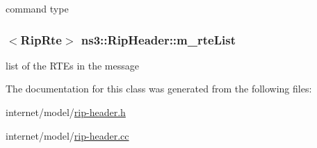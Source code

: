 command type 

\subsubsection[{\texorpdfstring{m\+\_\+rte\+List}{m_rteList}}]{$<${\bf Rip\+Rte}$>$ ns3\+::\+Rip\+Header\+::m\+\_\+rte\+List\hspace{0.3cm}{\ttfamily [private]}}\hypertarget{classns3_1_1RipHeader_a7dbfd5c554354b9d2ac9800177a7f420}{}\label{classns3_1_1RipHeader_a7dbfd5c554354b9d2ac9800177a7f420}


list of the R\+T\+Es in the message 



The documentation for this class was generated from the following files\+:\begin{DoxyCompactItemize}
\item 
internet/model/\hyperlink{rip-header_8h}{rip-\/header.\+h}\item 
internet/model/\hyperlink{rip-header_8cc}{rip-\/header.\+cc}\end{DoxyCompactItemize}
